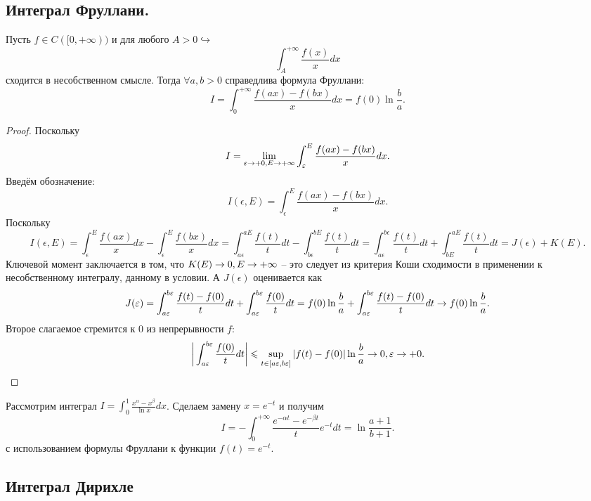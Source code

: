 \subsection{Интеграл Фруллани.}
\begin{lemma}
    Пусть $f \in C([0, +\infty))$ и для любого $A > 0 \hookrightarrow$
    \[
        \int_A^{+\infty} \dfrac{f(x)}{x}dx
    \]
    сходится в несобственном смысле.
    Тогда $\forall a, b > 0$ справедлива формула Фруллани:
    \[
        I = \int_0^{+\infty} \frac{f(ax) - f(bx)}{x}dx = f(0)\ln \frac{b}{a}.
    \]
\end{lemma}
\begin{proof}
    Поскольку
    \[
        I = \lim\limits_{\varepsilon \rightarrow +0, E \rightarrow +\infty} \int_{\varepsilon}^{E} \dfrac{f(ax) - f(bx)}{x}dx.
    \]
    Введём обозначение:
    \[
        I(\epsilon, E) = \int_{\epsilon}^{E} \dfrac{f(ax) - f(bx)}{x}dx.
    \]
    Поскольку
    \[
        I(\epsilon, E) = \int_{\epsilon}^E \dfrac{f(ax)}{x}dx - \int_{\epsilon}^{E} \dfrac{f(bx)}{x}dx = \int_{a\epsilon}^{aE} \dfrac{f(t)}{t}dt - \int_{b\epsilon}^{bE} \dfrac{f(t)}{t}dt = \int_{a\epsilon}^{b\epsilon} \dfrac{f(t)}{t}dt + \int_{bE}^{aE} \dfrac{f(t)}{t}dt = J(\epsilon) + K(E).
    \]
    Ключевой момент заключается в том, что $K(E) \rightarrow 0, E \rightarrow +\infty$ -- это следует из критерия Коши сходимости в применении к несобственному интегралу, данному в условии.
    А $J(\epsilon)$ оценивается как
    \[
        J(\varepsilon) = \int_{a\varepsilon}^{b\varepsilon} \dfrac{f(t) - f(0)}{t}dt + \int_{a \varepsilon}^{b\varepsilon} \dfrac{f(0)}{t}dt = f(0) \ln \frac{b}{a} + \int_{a\varepsilon}^{b\varepsilon} \dfrac{f(t) - f(0)}{t}dt \rightarrow f(0) \ln \frac{b}{a}.
    \]
    Второе слагаемое стремится к 0 из непрерывности $f$:
    \[
        \biggr|\int_{a \varepsilon}^{b\varepsilon} \dfrac{f(0)}{t}dt \biggr| \leqslant \sup\limits_{t \in [a\varepsilon, b \varepsilon]}|f(t) - f(0)| \ln \frac{b}{a} \rightarrow 0, \varepsilon \rightarrow +0.
    \]
\end{proof}
\begin{example}
    Рассмотрим интеграл $I = \int_0^1 \frac{x^\alpha - x^\beta}{\ln x}dx$.
    Сделаем замену $x = e^{-t}$ и получим
    \[
        I = -\int_0^{+\infty} \dfrac{e^{-\alpha t} - e^{-\beta t}}{t} e^{-t}dt = \ln \dfrac{a + 1}{b + 1}.
    \]
    с использованием формулы Фруллани к функции $f(t) = e^{-t}$.
\end{example}
\subsection{Интеграл Дирихле}

